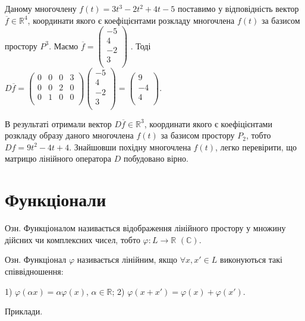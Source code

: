 Даному многочлену $f(t) = 3t^3 - 2t^2 + 4t - 5$ поставимо у відповідність
вектор $\overline{f} \in \mathbb{R}^4$, координати якого є коефіцієнтами розкладу многочлена $f(t)$ за
базисом простору $P^3$. Маємо $\overline{f} = \begin{pmatrix}
	-5 \\
	4 \\
	-2 \\
	3 \\
\end{pmatrix}$
. Тоді $D \overline{f} = \begin{pmatrix}
	0 & 0 & 0 & 3 \\
	0 & 0 & 2 & 0 \\
	0 & 1 & 0 & 0 \\
\end{pmatrix} \begin{pmatrix}
	-5 \\
	4 \\
	-2 \\
	3 \\
\end{pmatrix} = \begin{pmatrix}
	9 \\
	-4 \\
	4 \\
\end{pmatrix}$.

В результаті отримали вектор $D\overline{f} \in \mathbb{R}^3$, координати якого є коефіцієнтами
розкладу образу даного многочлена $f(t)$ за базисом простору $P_2$, тобто 
$D f = 9 t^2 - 4 t + 4$. Знайшовши похідну многочлена $f(t)$, легко перевірити, що
матрицю лінійного оператора $D$ побудовано вірно. 

\section{Функціонали}

Озн. Функціоналом називається відображення лінійного простору у множину
дійсних чи комплексних чисел, тобто $\varphi: L \rightarrow \mathbb{R}$ $(\mathbb{C})$.

Озн. Функціонал $\varphi$ називається лінійним, якщо $\forall x, x' \in L$ виконуються такі
співвідношення:

1) $\varphi(\alpha x) = \alpha \varphi(x)$, $\alpha \in \mathbb{R}$;
2) $\varphi(x + x') = \varphi(x) + \varphi(x')$.

Приклади.


